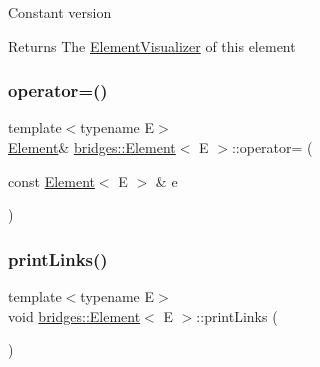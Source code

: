 Constant version

\begin{DoxyReturn}{Returns}
The \mbox{\hyperlink{classbridges_1_1_element_visualizer}{Element\+Visualizer}} of this element 
\end{DoxyReturn}
\mbox{\label{classbridges_1_1_element_a0f1b5a5688fe4db68f84969e93cea245}} 
\subsubsection{\texorpdfstring{operator=()}{operator=()}}
{\footnotesize\ttfamily template$<$typename E$>$ \\
\mbox{\hyperlink{classbridges_1_1_element}{Element}}\& \mbox{\hyperlink{classbridges_1_1_element}{bridges\+::\+Element}}$<$ E $>$\+::operator= (\begin{DoxyParamCaption}\item[{const \mbox{\hyperlink{classbridges_1_1_element}{Element}}$<$ E $>$ \&}]{e }\end{DoxyParamCaption})\hspace{0.3cm}{\ttfamily [inline]}}

\mbox{\label{classbridges_1_1_element_ae6f773c7222ff3a37c402e5e1f413c66}} 
\subsubsection{\texorpdfstring{print\+Links()}{printLinks()}}
{\footnotesize\ttfamily template$<$typename E$>$ \\
void \mbox{\hyperlink{classbridges_1_1_element}{bridges\+::\+Element}}$<$ E $>$\+::print\+Links (\begin{DoxyParamCaption}{ }\end{DoxyParamCaption})\hspace{0.3cm}{\ttfamily [inline]}}

\mbox{\label{classbridges_1_1_element_a0b905a076a71771a20ee4fb0ec858cfa}} 
